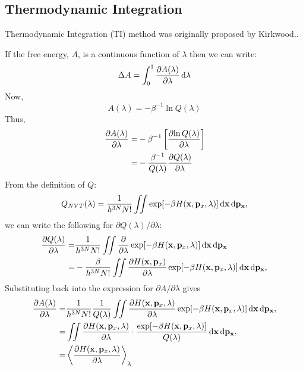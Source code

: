 \subsection{Thermodynamic Integration\label{Sec:FEM:TI}}
Thermodynamic Integration (TI) method was originally proposed by Kirkwood.\cite{KirkwoodJCP1935}. 
	
If the free energy, $A$, is a continuous function of $\lambda$ then we can write:
\begin{equation}
\Delta A = \int_{0}^{1} \frac{\partial{A(\lambda)}}{\partial{\lambda}} \mathop{}\!\mathrm{d}\lambda
\label{Eq:FEM:TI:deltaA1TI}
\end{equation} 
Now,
\begin{equation}
A(\lambda) = -\beta^{-1}\ln Q(\lambda)
\label{Eq:FEM:TI:Alambda}
\end{equation} 
Thus,
\begin{align}
\frac{\partial{A(\lambda)}}{\partial{\lambda}} =& -\beta^{-1} \left[ \frac{\partial{\ln{Q(\lambda)}}}{\partial{\lambda}} \right] \notag\\
=&-\frac{\beta^{-1}}{Q(\lambda)}\frac{\partial{Q(\lambda)}}{\partial{\lambda}}
\label{Eq:FEM:TI:deltaA2TI}
\end{align} 
From the definition of $Q$:
\begin{equation}
Q_{NVT}(\lambda) = \frac{1}{{h}^{3N}N!} \iint \exp[-\beta H(\mathbf{x},\mathbf{p}_{x},\lambda)] \mathop{}\!\mathrm{d}\mathbf{x}\mathop{}\!\mathrm{d}\mathbf{p}_\mathbf{x},
\label{Eq:FEM:TI:PFTI}
\end{equation}
we can write the following for $\partial{Q(\lambda)}/\partial{\lambda}$:
\begin{align}
\frac{\partial{Q(\lambda)}}{\partial{\lambda}} =&\frac{1}{{h}^{3N}N!} \iint \frac{\partial}{\partial{\lambda}}\exp[-\beta H(\mathbf{x},\mathbf{p}_{x},\lambda)] \mathop{}\!\mathrm{d}\mathbf{x}\mathop{}\!\mathrm{d}\mathbf{p}_\mathbf{x}\notag\\
=& -\frac{\beta}{{h}^{3N}N!} \iint \frac{\partial{H(\mathbf{x},\mathbf{p}_{x})}}{\partial{\lambda}}\exp[-\beta H(\mathbf{x},\mathbf{p}_{x},\lambda)] \mathop{}\!\mathrm{d}\mathbf{x}\mathop{}\!\mathrm{d}\mathbf{p}_\mathbf{x},
\label{Eq:FEM:TI:PPF2}
\end{align}
Substituting back into the expression for $\partial{A}/\partial{\lambda}$ gives
\begin{align}
\frac{\partial{A(\lambda)}}{\partial{\lambda}} =& \frac{1}{{h}^{3N}N!}\frac{1}{Q(\lambda)} \iint \frac{\partial{H(\mathbf{x},\mathbf{p}_{x},\lambda)}}{\partial{\lambda}}\exp[-\beta H(\mathbf{x},\mathbf{p}_{x},\lambda)] \mathop{}\!\mathrm{d}\mathbf{x}\mathop{}\!\mathrm{d}\mathbf{p}_\mathbf{x}, \notag\\
=& \iint \frac{\partial{H(\mathbf{x},\mathbf{p}_{x},\lambda)}}{\partial{\lambda}}\cdot\frac{\exp[-\beta H(\mathbf{x},\mathbf{p}_{x},\lambda)]}{Q(\lambda)} \mathop{}\!\mathrm{d}\mathbf{x}\mathop{}\!\mathrm{d}\mathbf{p}_\mathbf{x},\notag \\
=& \left \langle \frac{\partial{H(\mathbf{x},\mathbf{p}_{x}, \lambda)}}{\partial{\lambda}} \right \rangle_{\lambda}
\label{Eq:FEM:TI:PA2}
\end{align}
